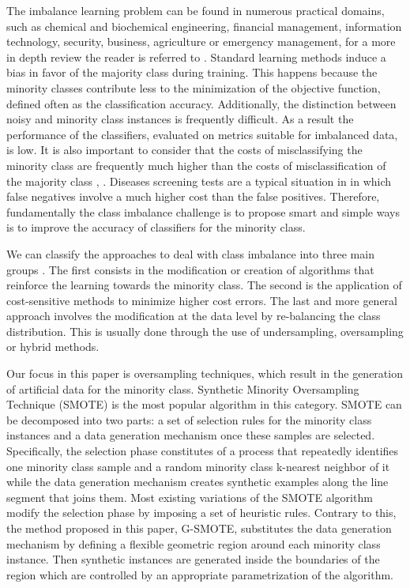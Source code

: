 \documentclass[parskip=full]{scrartcl}
\begin{document}
The imbalance learning problem can be found in numerous practical domains, such
as chemical and biochemical engineering, financial management, information
technology, security, business, agriculture or emergency management, for a more
in depth review the reader is referred to \cite{Haixiang2017}. Standard
learning methods induce a bias in favor of the majority class during training.
This happens because the minority classes contribute less to the minimization of
the objective function, defined often as the classification accuracy.
Additionally, the distinction between noisy and minority class instances is
frequently difficult. As a result the performance of the classifiers, evaluated
on metrics suitable for imbalanced data, is low. It is also important to
consider that the costs of misclassifying the minority class are frequently much
higher than the costs of misclassification of the majority class
\cite{Domingos1999}, \cite{Ting2002}. Diseases screening tests are a typical
situation in in which false negatives involve a much higher cost than the false
positives. Therefore, fundamentally the class imbalance challenge is to propose
smart and simple ways is to improve the accuracy of classifiers for the minority
class.

We can classify the approaches to deal with class imbalance into three main
groups \cite{Fernandez2013}. The first consists in the modification or creation
of algorithms that reinforce the learning towards the minority class. The second
is the application of cost-sensitive methods to minimize higher cost errors. The
last and more general approach involves the modification at the data level by
re-balancing the class distribution. This is usually done through the use of
undersampling, oversampling or hybrid methods.

Our focus in this paper is oversampling techniques, which result in the
generation of artificial data for the minority class. Synthetic Minority
Oversampling Technique (SMOTE) \cite{Chawla2002} is the most popular algorithm
in this category. SMOTE can be decomposed into two parts: a set of selection
rules for the minority class instances and a data generation mechanism once
these samples are selected. Specifically, the selection phase constitutes of a
process that repeatedly identifies one minority class sample and a random
minority class k-nearest neighbor of it while the data generation mechanism
creates synthetic examples along the line segment that joins them. Most existing
variations of the SMOTE algorithm modify the selection phase by imposing a set
of heuristic rules. Contrary to this, the method proposed in this paper,
G-SMOTE, substitutes the data generation mechanism by defining a flexible
geometric region around each minority class instance. Then synthetic instances
are generated inside the boundaries of the region which are controlled by an
appropriate parametrization of the algorithm.
\end{document}
